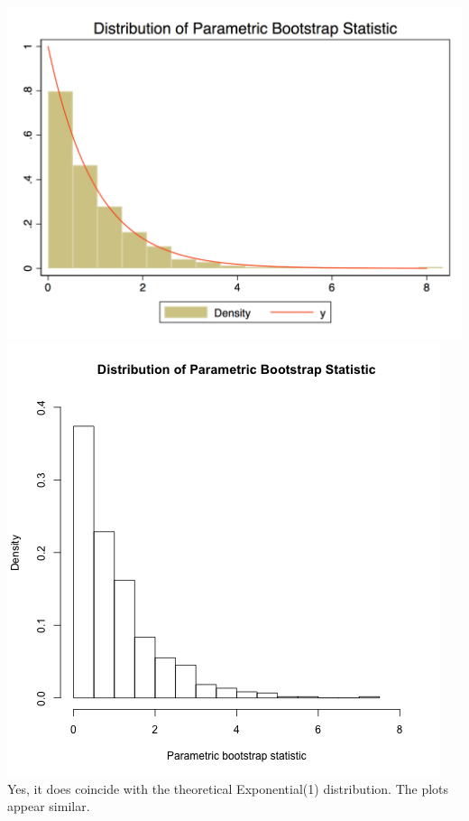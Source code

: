\documentclass[12pt]{article}
\begin{document}
\subsection{}
\includegraphics[totalheight=6cm]{hw3_Q3_2_stata.png}
\includegraphics[totalheight=6cm]{hw3_q3_3_r.png}\\

Yes, it does coincide with the theoretical Exponential(1) distribution. The plots appear similar.
\subsection{}
\end{document}
